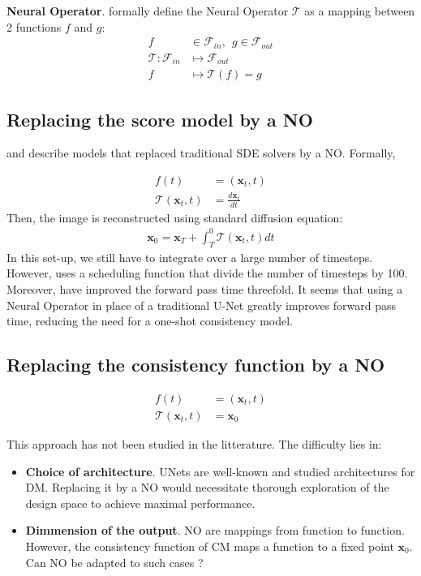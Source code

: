 \noindent \textbf{Neural Operator}. \cite{duruisseaux2026fourierneuraloperatorsexplained} formally define the Neural Operator $\mathcal{T}$ as a mapping between 2 functions $f$ and $g$:
\begin{align}
  f & \in \mathcal{F}_{in}, \: \: g \in \mathcal{F}_{out} \\
  \mathcal{T} : \mathcal{F}_{in} & \mapsto \mathcal{F}_{out} \\
  f & \mapsto \mathcal{T}(f) = g
\end{align}

\subsection{Replacing the score model by a NO} \label{NO}

\noindent \cite{dong2025datadrivenstochasticclosuremodeling} and \cite{liu2025difffnodiffusionfourierneural} describe models that replaced traditional SDE solvers by a NO. Formally,

\begin{align}
  f(t) & = (\mathbf{x}_t, t) \\
  \mathcal{T}(\mathbf{x}_t, t) & = \frac{d\mathbf{x}_t}{dt}
\end{align} 
\noindent Then, the image is reconstructed using standard diffusion equation:
\begin{align*}
  \mathbf{x}_0 = \mathbf{x}_T + \int^{0}_T \mathcal{T}(\mathbf{x}_t, t)dt
\end{align*}
\noindent In this set-up, we still have to integrate over a large number of timesteps. However, \cite{dong2025datadrivenstochasticclosuremodeling} uses a scheduling function that divide the number of timesteps by 100. Moreover, \cite{liu2025difffnodiffusionfourierneural} have improved the forward pass time threefold. It seems that using a Neural Operator in place of a traditional U-Net greatly improves forward pass time, reducing the need for a one-shot consistency model.

\subsection{Replacing the consistency function by a NO}

\begin{align}
  f(t) & = (\mathbf{x}_t, t) \\
  \mathcal{T}(\mathbf{x}_t, t) & = \mathbf{x}_0
\end{align} 

\noindent This approach has not been studied in the litterature. The difficulty lies in:
\begin{itemize}
\item \textbf{Choice of architecture}. UNets are well-known and studied architectures for DM. Replacing it by a NO would necessitate thorough exploration of the design space to achieve maximal performance.
\item \textbf{Dimmension of the output}. NO are mappings from function to function. However, the consistency function of CM maps a function to a fixed point $\mathbf{x}_0$. Can NO be adapted to such cases ?
\end{itemize}

